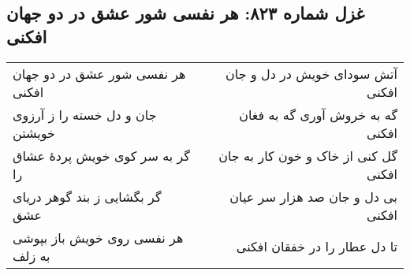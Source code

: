 \begin{center}
\section*{غزل شماره ۸۲۳: هر نفسی شور عشق در دو جهان افکنی}
\label{sec:823}
\begin{longtable}{l p{0.5cm} r}
هر نفسی شور عشق در دو جهان افکنی
&&
آتش سودای خویش در دل و جان افکنی
\\
جان و دل خسته را ز آرزوی خویشتن
&&
گه به خروش آوری گه به فغان افکنی
\\
گر به سر کوی خویش پردهٔ عشاق را
&&
گل کنی از خاک و خون کار به جان افکنی
\\
گر بگشایی ز بند گوهر دریای عشق
&&
بی دل و جان صد هزار سر عیان افکنی
\\
هر نفسی روی خویش باز بپوشی به زلف
&&
تا دل عطار را در خفقان افکنی
\\
\end{longtable}
\end{center}

